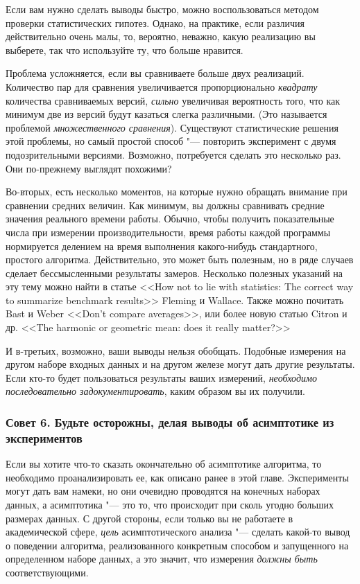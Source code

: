 \begin{note}
Если вам нужно сделать выводы быстро, можно воспользоваться методом проверки статистических гипотез. Однако, на практике, если различия действительно очень малы, то, вероятно, неважно, какую реализацию вы выберете, так что используйте ту, что больше нравится.
\end{note}

Проблема усложняется, если вы сравниваете больше двух реализаций. Количество пар для сравнения увеличивается пропорционально \textit{квадрату} количества сравниваемых версий, \textit{сильно} увеличивая вероятность того, что как минимум две из версий будут казаться слегка различными. (Это называется проблемой \textit{множественного сравнения}). Существуют статистические решения этой проблемы, но самый простой способ "--- повторить эксперимент с двумя подозрительными версиями. Возможно, потребуется сделать это несколько раз. Они по-прежнему выглядят похожими?

Во-вторых, есть несколько моментов, на которые нужно обращать внимание при сравнении средних величин. Как минимум, вы должны сравнивать средние значения реального времени работы. Обычно, чтобы получить показательные числа при измерении производительности, время работы каждой программы нормируется делением на время выполнения какого-нибудь стандартного, простого алгоритма. Действительно, это может быть полезным, но в ряде случаев сделает бессмысленными результаты замеров. Несколько полезных указаний на эту тему можно найти в статье <<How not to lie with statistics: The correct way to summarize benchmark results>> Fleming и Wallace. Также можно почитать Bast и Weber <<Don't compare averages>>, или более новую статью Citron и др. <<The harmonic or geometric mean: does it really matter?>>

И в-третьих, возможно, ваши выводы нельзя обобщать. Подобные измерения на другом наборе входных данных и на другом железе могут дать другие результаты. Если кто-то будет пользоваться результаты ваших измерений, \textit{необходимо последовательно задокументировать}, каким образом вы их получили.

\subsubsection*{Совет 6. Будьте осторожны, делая выводы об асимптотике из экспериментов}

Если вы хотите что-то сказать окончательно об асимптотике алгоритма, то необходимо проанализировать ее, как описано ранее в этой главе. Эксперименты могут дать вам намеки, но они очевидно проводятся на конечных наборах данных, а асимптотика "--- это то, что происходит при сколь угодно больших размерах данных. С другой стороны, если только вы не работаете в академической сфере, \textit{цель} асимптотического анализа "--- сделать какой-то вывод о поведении алгоритма, реализованного конкретным способом и запущенного на определенном наборе данных, а это значит, что измерения \textit{должны быть} соответствующими.

